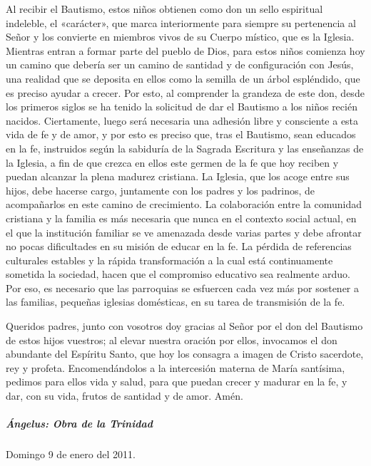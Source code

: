 \documentclass[]{article}
\let\oldsubparagraph\subparagraph
\renewcommand{\subparagraph}[1]{\oldsubparagraph{#1}\mbox{}}
\begin{document}
Al recibir el Bautismo, estos niños obtienen como don un sello
espiritual indeleble, el «carácter», que marca interiormente para
siempre su pertenencia al Señor y los convierte en miembros vivos de su
Cuerpo místico, que es la Iglesia. Mientras entran a formar parte del
pueblo de Dios, para estos niños comienza hoy un camino que debería ser
un camino de santidad y de configuración con Jesús, una realidad que se
deposita en ellos como la semilla de un árbol espléndido, que es preciso
ayudar a crecer. Por esto, al comprender la grandeza de este don, desde
los primeros siglos se ha tenido la solicitud de dar el Bautismo a los
niños recién nacidos. Ciertamente, luego será necesaria una adhesión
libre y consciente a esta vida de fe y de amor, y por esto es preciso
que, tras el Bautismo, sean educados en la fe, instruidos según la
sabiduría de la Sagrada Escritura y las enseñanzas de la Iglesia, a fin
de que crezca en ellos este germen de la fe que hoy reciben y puedan
alcanzar la plena madurez cristiana. La Iglesia, que los acoge entre sus
hijos, debe hacerse cargo, juntamente con los padres y los padrinos, de
acompañarlos en este camino de crecimiento. La colaboración entre la
comunidad cristiana y la familia es más necesaria que nunca en el
contexto social actual, en el que la institución familiar se ve
amenazada desde varias partes y debe afrontar no pocas dificultades en
su misión de educar en la fe. La pérdida de referencias culturales
estables y la rápida transformación a la cual está continuamente
sometida la sociedad, hacen que el compromiso educativo sea realmente
arduo. Por eso, es necesario que las parroquias se esfuercen cada vez
más por sostener a las familias, pequeñas iglesias domésticas, en su
tarea de transmisión de la fe.

Queridos padres, junto con vosotros doy gracias al Señor por el don del
Bautismo de estos hijos vuestros; al elevar nuestra oración por ellos,
invocamos el don abundante del Espíritu Santo, que hoy los consagra a
imagen de Cristo sacerdote, rey y profeta. Encomendándolos a la
intercesión materna de María santísima, pedimos para ellos vida y salud,
para que puedan crecer y madurar en la fe, y dar, con su vida, frutos de
santidad y de amor.
Amén.\protect\hypertarget{_Toc448662890}{}{\protect\hypertarget{_Toc448690409}{}{}}

\subparagraph{Ángelus: Obra de la
Trinidad}\label{uxe1ngelus-obra-de-la-trinidad}

Domingo 9 de enero del 2011.
\end{document}
